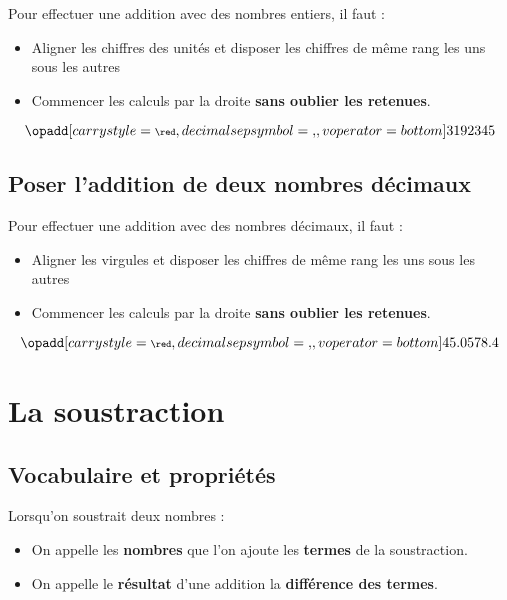 \begin{pageCours}
\begin{Mt}
Pour effectuer une addition avec des nombres entiers, il faut :
\begin{itemize}
    \item Aligner les chiffres des unités et disposer les chiffres de même rang les uns sous les autres
    \item Commencer les calculs par la droite \textbf{sans oublier les retenues}.
\end{itemize}
\bigskip
\[\opadd[carrystyle=\scriptsize\red,
decimalsepsymbol={,},
voperator=bottom]{3192}{345}\]
\end{Mt} 

\subsection{Poser l'addition de deux nombres décimaux}

\begin{Mt}
Pour effectuer une addition avec des nombres décimaux, il faut :
\begin{itemize}
    \item Aligner les virgules et disposer les chiffres de même rang les uns sous les autres
    \item Commencer les calculs par la droite \textbf{sans oublier les retenues}.
\end{itemize}
\bigskip
\[\opadd[carrystyle=\scriptsize\red,
decimalsepsymbol={,},
voperator=bottom]{45.05}{78.4}\]
\end{Mt} 


\section{La soustraction}

\subsection{Vocabulaire et propriétés}

\begin{Def}
Lorsqu'on soustrait deux nombres :
\begin{itemize}
\item On appelle les \textbf{nombres} que l'on ajoute les \textbf{termes} de la soustraction.
\item On appelle le \textbf{résultat} d'une addition la \textbf{différence des termes}.
\end{itemize}
\end{Def}


\end{pageCours}
